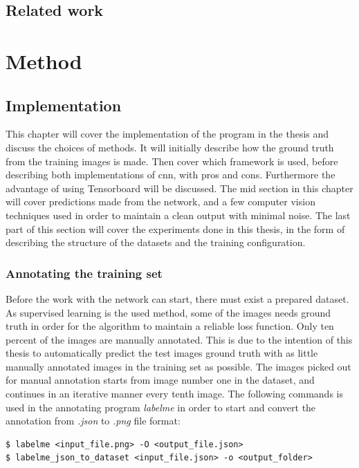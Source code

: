 \documentclass[USenglish]{ifimaster}  %
\begin{document}
\section{Related work}

\chapter{Method}\label{method}
\section{Implementation}
This chapter will cover the implementation of the program in the thesis and discuss the choices of methods. It will initially describe how the ground truth from the training images is made. Then cover which framework is used, before describing both implementations of \ac{cnn}, with pros and cons. Furthermore the advantage of using Tensorboard will be discussed. The mid section in this chapter will cover predictions made from the network, and a few computer vision techniques used in order to maintain a clean output with minimal noise. The last part of this section will cover the experiments done in this thesis, in the form of describing the structure of the datasets and the training configuration.
\subsection{Annotating the training set}
Before the work with the network can start, there must exist a prepared dataset. As supervised learning is the used method, some of the images needs ground truth in order for the algorithm to maintain a reliable loss function. Only ten percent of the images are manually annotated. This is due to the intention of this thesis to automatically predict the test images ground truth with as little manually annotated images in the training set as possible. The images picked out for manual annotation starts from image number one in the dataset, and continues in an iterative manner every tenth image. The following commands is used in the annotating program \textit{labelme} in order to start and convert the annotation from \textit{.json} to \textit{.png} file format:   

\begin{verbatim}
$ labelme <input_file.png> -O <output_file.json>
$ labelme_json_to_dataset <input_file.json> -o <output_folder>
\end{verbatim}
\end{document}
